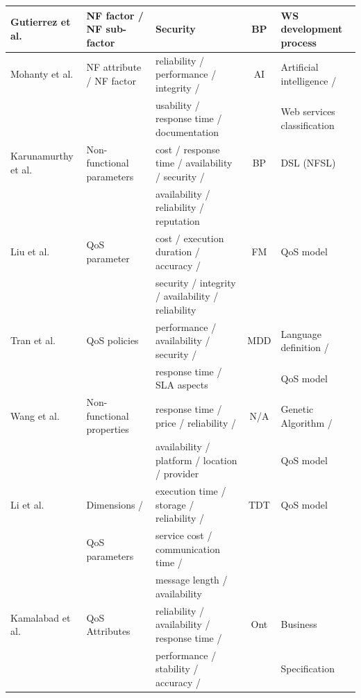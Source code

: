 \documentclass{sig-alternate}
\begin{document}
\begin{table}[ht!]
\begin{tabular}{l|l|l|c|l}
  \hline
  Gutierrez et al. \cite{GutierrezRF10} & NF factor / NF sub-factor & Security  & BP &  WS development process
  \\  
  \hline
  Mohanty et al. \cite{MohantyRP10} & NF attribute / NF factor & reliability /
  performance / integrity / & AI & Artificial intelligence /\\ 
  &  &  usability / response time / documentation &   & Web services classification	 \\
  \hline  
   Karunamurthy et al. \cite{Karunamurthy2012787} & Non-functional parameters &
   cost / response time / availability /  security /   & BP &  DSL (NFSL)
\\
   &  & availability / reliability / reputation   &  & 
  \\  
  \hline  
   Liu et al. \cite{Liu20121080} & QoS parameter &
   cost / execution duration / accuracy /  & FM  &  QoS model
\\
   &  &  security / integrity / availability / reliability   &   & 
  \\
  \hline 
 
   Tran et al. \cite{Tran2012531} & QoS policies &
   performance / availability / security /  & MDD  &  Language definition /
\\
   &  &  response time /  SLA aspects  &   &  QoS model
  \\  
  \hline   

 
   Wang et al. \cite{Wang2012} & Non-functional properties &
   response time / price / reliability /   & N/A  &  Genetic Algorithm /
\\
   &  & availability / platform / location / provider   &   &  QoS model
  \\  
  \hline  
  
     Li et al. \cite{Li2013} & Dimensions / &
  execution time / storage / reliability /  & TDT  &   QoS model
\\
   & QoS parameters & service cost / communication time /    &   &  
  \\
  
   &  & message length / availability    &  & 
  \\  
  \hline   
   
      Kamalabad et al. \cite{Kamalabad2012} & QoS Attributes &
   reliability / availability / response time /   & Ont  &  Business
   
\\
   &  & performance / stability / accuracy /    &   &  Specification
  \\
  

\end{tabular}
\end{table}
\end{document}
